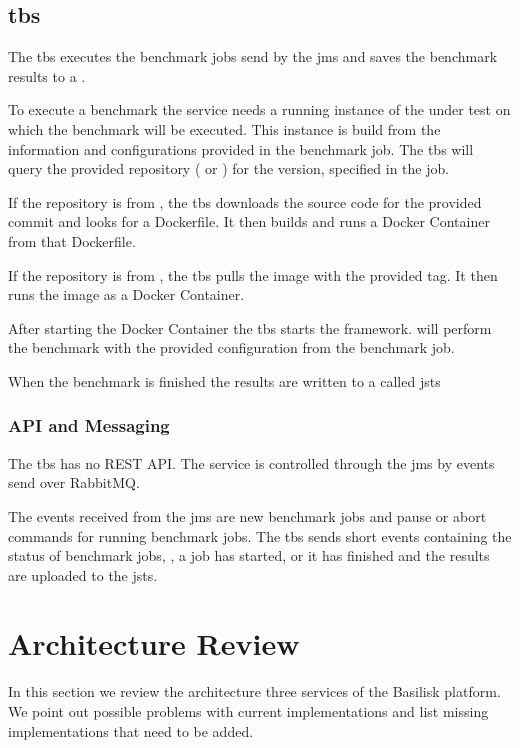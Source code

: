 \subsection{\acl{tbs}}
\label{sec:ts_benchmarking_service}
The \ac{tbs} executes the benchmark jobs send by the \ac{jms} and saves the benchmark results to a \ts{}.

To execute a benchmark the service needs a running instance of the \ts{} under test on which the benchmark will be executed.
This instance is build from the information and configurations provided in the benchmark job.
The \ac{tbs} will query the provided repository (\gh{} or \dockh{}) for the version, specified in the job.

If the repository is from \gh{}, the \ac{tbs} downloads the source code for the provided commit and looks for a Dockerfile.
It then builds and runs a Docker Container from that Dockerfile.

If the repository is from \dockh{}, the \ac{tbs} pulls the image with the provided tag.
It then runs the image as a Docker Container.

After starting the Docker Container the \ac{tbs} starts the \iguana{} framework.
\iguana{} will perform the benchmark with the provided configuration from the benchmark job.

When the benchmark is finished the results are written to a \ts{} called \acl*{jsts}

\subsubsection{API and Messaging}
\label{sec:benchmarking_api}
The \ac{tbs} has no REST API.
The service is controlled through the \ac{jms} by events send over RabbitMQ.

The events received from the \ac{jms} are new benchmark jobs and pause or abort commands for running benchmark jobs.
The \ac{tbs} sends short events containing the status of benchmark jobs, \eg, a job has started, or it has finished and the results are uploaded to the \acl{jsts}.



\section{Architecture Review}
\label{sec:architecture_review}
In this section we review the architecture three services of the Basilisk platform.
We point out possible problems with current implementations and list missing implementations that need to be added.

